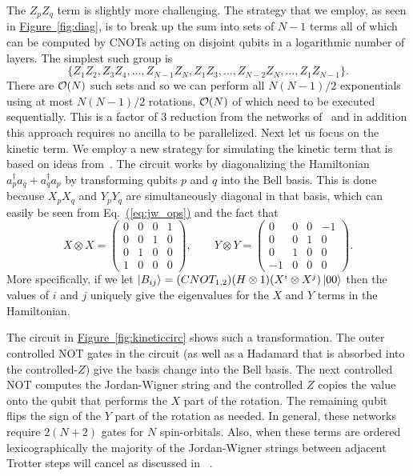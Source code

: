 \documentclass[superscriptaddress,aps,pra,nofootinbib,notitlepage,10pt,longbibliography]{revtex4-1}
\newcommand{\eq}[1]{Eq.~\hyperref[eq:#1]{(\ref*{eq:#1})}}
\newcommand{\fig}[1]{\hyperref[fig:#1]{Figure~\ref*{fig:#1}}}
\def\ket#1{\mathinner{|{#1}\rangle}}
\begin{document}
The $Z_pZ_q$ term is slightly more challenging.  The strategy that we employ, as seen in \fig{diag}, is to break up the sum into sets of $N-1$ terms all of which can be computed by CNOTs acting on disjoint qubits in a logarithmic number of layers.  The simplest such group is $$\{Z_1Z_2,Z_3Z_4,\ldots, Z_{N-1}Z_N,Z_1Z_3,\ldots, Z_{N-2}Z_N,\ldots, Z_1Z_{N-1}\}.$$ There are ${\cal O}(N)$ such sets and so we can perform all $N(N-1)/2$ exponentials using at most $N(N-1)/2$ rotations, ${\cal O}(N)$ of which need to be executed sequentially.  This is a factor of $3$ reduction from the networks of~\cite{Whitfield2010} and in addition this approach requires no ancilla to be parallelized. Next let us focus on the kinetic term.  We employ a new strategy for simulating the kinetic term that is based on ideas from~\cite{Reiher2017}.  The circuit works by diagonalizing the Hamiltonian $a^\dagger_p a_q + a^\dagger_q a_p$ by transforming qubits $p$ and $q$ into the Bell basis.  This is done because $X_pX_q$ and $Y_pY_q$ are simultaneously diagonal in that basis, which can easily be seen from \eq{jw_ops} and the fact that
\begin{equation}
X\otimes X = \begin{pmatrix} 0 & 0&0&1\\0&0&1&0\\0&1&0&0\\1&0&0&0 \end{pmatrix},\qquad Y\otimes Y = \begin{pmatrix} 0 & 0&0&-1\\0&0&1&0\\0&1&0&0\\-1&0&0&0 \end{pmatrix}.
\end{equation}
More specifically, if we let $\ket{B_{ij}}=(CNOT_{1,2})(H\otimes 1)(X^i\otimes X^j)\ket{00}$ then the values of $i$ and $j$ uniquely give the eigenvalues for the $X$ and $Y$ terms in the Hamiltonian.  

The circuit in \fig{kineticcirc} shows such a transformation.  The outer controlled NOT gates in the circuit (as well as a Hadamard that is absorbed into the controlled-$Z$) give the basis change into the Bell basis.  The next controlled NOT computes the Jordan-Wigner string and the controlled $Z$ copies the value onto the qubit that performs the $X$ part of the rotation.  The remaining qubit flips the sign of the $Y$ part of the rotation as needed.  In general, these networks require $2(N+2)$ gates for $N$ spin-orbitals.  Also, when these terms are ordered lexicographically the majority of the Jordan-Wigner strings between adjacent Trotter steps will cancel as discussed in ~\cite{Wecker2015a}.
\end{document}
